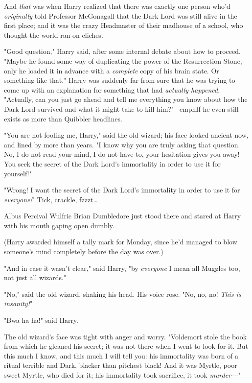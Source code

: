 And \emph{that} was when Harry realized that there was exactly one person who'd 
\emph{originally} told Professor McGonagall that the Dark Lord was still alive 
in the first place; and it was the crazy Headmaster of their madhouse of a 
school, who thought the world ran on cliches.

"Good question," Harry said, after some internal debate about how to proceed. 
"Maybe he found some way of duplicating the power of the Resurrection Stone, 
only he loaded it in advance with a \emph{complete} copy of his brain state. Or 
something like that." Harry was suddenly far from sure that he was trying to 
come up with an explanation for something that had \emph{actually happened}. 
"Actually, can you just go ahead and tell me everything you know about how the 
Dark Lord survived and what it might take to kill him?" \ emph{If he even still 
exists as more than Quibbler headlines.}

"You are not fooling me, Harry," said the old wizard; his face looked ancient 
now, and lined by more than years. "I know why you are truly asking that 
question. No, I do not read your mind, I do not have to, your hesitation gives 
you away! You seek the secret of the Dark Lord's immortality in order to use it 
for yourself!"

"Wrong! I want the secret of the Dark Lord's immortality in order to use it for 
\emph{everyone!}"
\sbreak
Tick, crackle, fzzzt{\ldots}

Albus Percival Wulfric Brian Dumbledore just stood there and stared at Harry 
with his mouth gaping open dumbly.

(Harry awarded himself a tally mark for Monday, since he'd managed to blow 
someone's mind completely before the day was over.)

"And in case it wasn't clear," said Harry, "by \emph{everyone} I mean all 
Muggles too, not just all wizards."

"No," said the old wizard, shaking his head. His voice rose. "No, no, no! 
\emph{This is insanity!}"

"Bwa ha ha!" said Harry.

The old wizard's face was tight with anger and worry. "Voldemort stole the book 
from which he gleaned his secret; it was not there when I went to look for it. 
But this much I know, and this much I will tell you: his immortality was born 
of a ritual terrible and Dark, blacker than pitchest black! And it was Myrtle, 
poor sweet Myrtle, who died for it; his immortality took sacrifice, it took 
\emph{murder---}"

